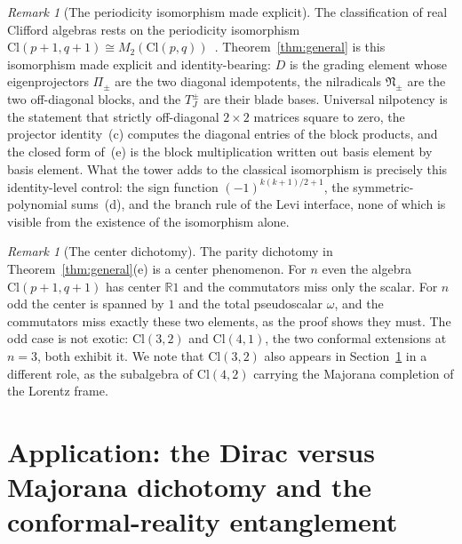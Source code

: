 \documentclass{birkjour}
\theoremstyle{definition}
\theoremstyle{remark}
\newtheorem{rem}[thm]{Remark}
\numberwithin{equation}{section}
\newcommand{\Cl}{\mathrm{Cl}}
\newcommand{\fkN}{\mathfrak{N}}
\newcommand{\R}{\mathbb{R}}
\newenvironment{revblock}{}{}
\begin{document}
\begin{revblock}
\begin{rem}[The periodicity isomorphism made explicit]
\label{rem:periodicity}
The classification of real Clifford algebras rests on the
periodicity isomorphism
$\Cl(p+1,q+1)\cong M_2(\Cl(p,q))$~\cite{Lounesto2001,
Porteous1995}. Theorem~\ref{thm:general} is this
isomorphism made explicit and identity-bearing: $D$ is the
grading element whose eigenprojectors $\Pi_\pm$ are the two
diagonal idempotents, the nilradicals $\fkN_\pm$ are the two
off-diagonal blocks, and the $T^\pm_J$ are their blade
bases. Universal nilpotency is the statement that strictly
off-diagonal $2\times2$ matrices square to zero, the
projector identity~(c) computes the diagonal entries of the
block products, and the closed form of~(e) is the block
multiplication written out basis element by basis element.
What the tower adds to the classical isomorphism is
precisely this identity-level control: the sign function
$(-1)^{k(k+1)/2+1}$, the symmetric-polynomial sums~(d), and
the branch rule of the Levi interface, none of which is
visible from the existence of the isomorphism alone.
\end{rem}

\begin{rem}[The center dichotomy]\label{rem:center}
The parity dichotomy in Theorem~\ref{thm:general}(e) is a
center phenomenon. For $n$ even the algebra
$\Cl(p+1,q+1)$ has center $\R 1$ and the commutators miss
only the scalar. For $n$ odd the center is spanned by $1$
and the total pseudoscalar $\omega$, and the commutators
miss exactly these two elements, as the proof shows they
must. The odd case is not exotic: $\Cl(3,2)$ and
$\Cl(4,1)$, the two conformal extensions at $n=3$, both
exhibit it. We note that $\Cl(3,2)$ also appears in
Section~\ref{sec:entangle} in a different role, as the
subalgebra of $\Cl(4,2)$ carrying the Majorana completion
of the Lorentz frame.
\end{rem}
\end{revblock}


\section{Application: the Dirac versus Majorana dichotomy
and the conformal-reality entanglement}\label{sec:entangle}
\end{document}
